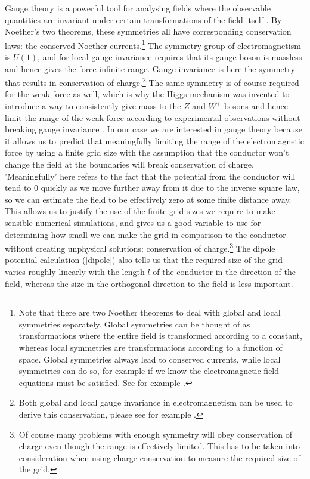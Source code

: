 \documentclass[aps,twocolumn,pre,nofootinbib,10pt]{revtex4-1}
\begin{document}
Gauge theory is a powerful tool for analysing fields where the observable quantities are invariant under certain transformations of the field itself \cite{gaugetheory1}. By Noether's two theorems, these symmetries all have corresponding conservation laws: the conserved Noether currents.\footnote{Note that there are two Noether theorems to deal with global and local symmetries separately. Global symmetries can be thought of as transformations where the entire field is transformed according to a constant, whereas local symmetries are transformations according to a function of space. Global symmetries always lead to conserved currents, while local symmetries can do so, for example if we know the electromagnetic field equations must be satisfied. See for example \cite{gaugetheory2}.} The symmetry group of electromagnetism is $U(1)$, and for local gauge invariance requires that its gauge boson is massless and hence gives the force infinite range. Gauge invariance is here the symmetry that results in conservation of charge.\footnote{Both global and local gauge invariance in electromagnetism can be used to derive this conservation, please see for example \cite{gaugetheory4}.} The same symmetry is of course required for the weak force as well, which is why the Higgs mechanism was invented to introduce a way to consistently give mass to the 
$Z$ and $W^{\pm}$ bosons and hence limit the range of the weak force according to experimental observations without breaking gauge invariance \cite{gaugetheory3}. In our case we are interested in gauge theory because it allows us to predict that meaningfully limiting the range of the electromagnetic force by using a finite grid size with the assumption that the conductor won't change the field at the 
boundaries will break conservation of charge. 'Meaningfully' here refers to the fact that the potential from the conductor will tend to 0 quickly as we move further away from it due to the inverse square law, so we can estimate the field to be effectively zero at some finite distance away. This allows us to justify the use of the finite grid sizes we require to make sensible numerical simulations, and gives us a good variable to use for determining how small we can make the grid in comparison to the conductor without creating unphysical solutions: conservation of charge.\footnote{Of course many problems with enough symmetry will obey conservation of charge even though the range is effectively limited. This has to be taken into consideration when using charge conservation to measure the required size of the grid.} The dipole potential calculation (\ref{dipole}) also tells us that the required size of the grid varies roughly linearly with the length $l$ of the conductor in the direction of the field, whereas 
the size in the 
orthogonal direction to the field is less important.
\end{document}
